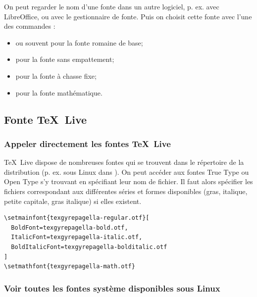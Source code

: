 On peut regarder le nom d'une fonte dans un autre logiciel, p. ex. avec LibreOffice, ou avec le gestionnaire de fonte. Puis on choisit cette fonte avec l'une des commandes : 

\begin{itemize}
	\item \texttt{\setmainfont{nom de la fonte}} ou souvent \texttt{\setromanfont} pour la fonte romaine de base;
	\item \texttt{\setsansfont{nom de la fonte}} pour la fonte sans empattement;
	\item \texttt{\setmonofont{nom de la fonte}} pour la fonte à chasse fixe;
	\item \texttt{} pour la fonte mathématique.
\end{itemize}




\subsection{Fonte \TeX \ Live}
\label{sec:fonteTeXLive}


\subsubsection{Appeler directement les fontes \TeX \ Live}
\TeX \ Live dispose de nombreuses fontes qui se trouvent dans le répertoire de la distribution (p. ex. sous Linux dans ). On peut accéder aux fontes True Type ou Open Type s'y trouvant en spécifiant leur nom de fichier. Il faut alors spécifier les fichiers correspondant aux différentes séries et formes disponibles (gras, italique, petite capitale, gras italique) si elles existent.

\begin{verbatim}
\setmainfont{texgyrepagella-regular.otf}[
  BoldFont=texgyrepagella-bold.otf,
  ItalicFont=texgyrepagella-italic.otf,
  BoldItalicFont=texgyrepagella-bolditalic.otf
]
\setmathfont{texgyrepagella-math.otf}
\end{verbatim}


\subsubsection{Voir toutes les fontes système disponibles sous Linux}

